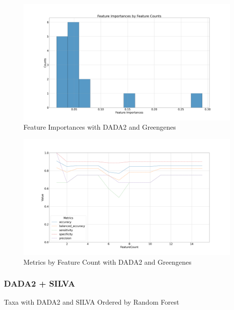 \documentclass[a4paper]{article}
\begin{document}
                \begin{figure}[p]
                    \centering
                    \includegraphics[width=0.7 \linewidth]{figures/RandomForest/ANCOM.DADA2.gg/importances.png}
                    \caption{Feature Importances with DADA2 and Greengenes}
                    \label{fig:importances-DADA2-gg}
                \end{figure}

                \begin{figure}[p]
                    \centering
                    \includegraphics[width=0.7 \linewidth]{figures/RandomForest/ANCOM.DADA2.gg/metrics.png}
                    \caption{Metrics by Feature Count with DADA2 and Greengenes}
                    \label{fig:metrics-DADA2-gg}
                \end{figure}

            \subsubsection{DADA2 + SILVA}

                \begin{table}[p]
                    \centering
                    \caption{Taxa with DADA2 and SILVA Ordered by Random Forest}
                    \label{tb:RF-whole-dada2-silva}

                \end{table}
\end{document}
